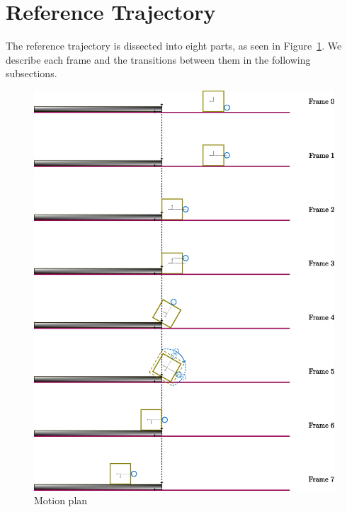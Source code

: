 \section{Reference Trajectory}
\label{sec:reftraj}
%
The reference trajectory is dissected into eight parts, as seen in
Figure~\ref{fig:motion_plan}. We describe each frame and the transitions between
them in the following subsections. 
%
\begin{figure}[tb]
  \centering
  \includegraphics[width=0.731\textheight]{./figures/motion_plan_v1.eps}
  \caption{Motion plan} 
  \label{fig:motion_plan}
\end{figure}
%

